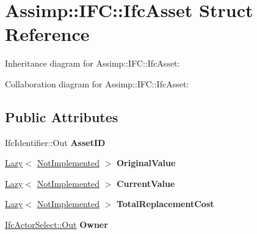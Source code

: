 \hypertarget{struct_assimp_1_1_i_f_c_1_1_ifc_asset}{\section{Assimp\+:\+:I\+F\+C\+:\+:Ifc\+Asset Struct Reference}
\label{struct_assimp_1_1_i_f_c_1_1_ifc_asset}
}


Inheritance diagram for Assimp\+:\+:I\+F\+C\+:\+:Ifc\+Asset\+:


Collaboration diagram for Assimp\+:\+:I\+F\+C\+:\+:Ifc\+Asset\+:
\subsection*{Public Attributes}
\begin{DoxyCompactItemize}
\item 
\hypertarget{struct_assimp_1_1_i_f_c_1_1_ifc_asset_a6b6df5b4996d87ed9f314b011112a3f1}{Ifc\+Identifier\+::\+Out {\bfseries Asset\+I\+D}}\label{struct_assimp_1_1_i_f_c_1_1_ifc_asset_a6b6df5b4996d87ed9f314b011112a3f1}

\item 
\hypertarget{struct_assimp_1_1_i_f_c_1_1_ifc_asset_a776ddc93c744968e3f9c0570ff679b74}{\hyperlink{struct_assimp_1_1_s_t_e_p_1_1_lazy}{Lazy}$<$ \hyperlink{struct_assimp_1_1_i_f_c_1_1_not_implemented}{Not\+Implemented} $>$ {\bfseries Original\+Value}}\label{struct_assimp_1_1_i_f_c_1_1_ifc_asset_a776ddc93c744968e3f9c0570ff679b74}

\item 
\hypertarget{struct_assimp_1_1_i_f_c_1_1_ifc_asset_a6baa0a96580c5b3b640dc9a73a0e19d3}{\hyperlink{struct_assimp_1_1_s_t_e_p_1_1_lazy}{Lazy}$<$ \hyperlink{struct_assimp_1_1_i_f_c_1_1_not_implemented}{Not\+Implemented} $>$ {\bfseries Current\+Value}}\label{struct_assimp_1_1_i_f_c_1_1_ifc_asset_a6baa0a96580c5b3b640dc9a73a0e19d3}

\item 
\hypertarget{struct_assimp_1_1_i_f_c_1_1_ifc_asset_a879fab98059a641bfe61876354d977f8}{\hyperlink{struct_assimp_1_1_s_t_e_p_1_1_lazy}{Lazy}$<$ \hyperlink{struct_assimp_1_1_i_f_c_1_1_not_implemented}{Not\+Implemented} $>$ {\bfseries Total\+Replacement\+Cost}}\label{struct_assimp_1_1_i_f_c_1_1_ifc_asset_a879fab98059a641bfe61876354d977f8}

\item 
\hypertarget{struct_assimp_1_1_i_f_c_1_1_ifc_asset_a9a3744965680b10431367eb2fca468e2}{\hyperlink{classboost_1_1shared__ptr}{Ifc\+Actor\+Select\+::\+Out} {\bfseries Owner}}\label{struct_assimp_1_1_i_f_c_1_1_ifc_asset_a9a3744965680b10431367eb2fca468e2}


\end{DoxyCompactItemize}
